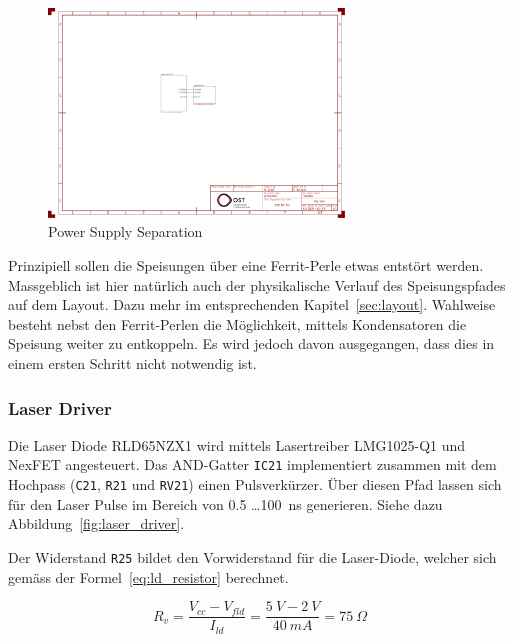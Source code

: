 \begin{figure}[H]
    \centering
    \includegraphics[page=2, trim=260 90 640 550, clip, width=0.7\textwidth]{attachments/schematic.pdf}
    \caption{Power Supply Separation}\label{fig:power_supply_separation}
\end{figure}

Prinzipiell sollen die Speisungen über eine Ferrit-Perle etwas entstört werden. Massgeblich ist hier natürlich auch der
physikalische Verlauf des Speisungspfades auf dem Layout. Dazu mehr im entsprechenden Kapitel~\ref{sec:layout}. Wahlweise
besteht nebst den Ferrit-Perlen die Möglichkeit, mittels Kondensatoren die Speisung weiter zu entkoppeln. Es wird jedoch
davon ausgegangen, dass dies in einem ersten Schritt nicht notwendig ist.

\subsubsection{Laser Driver}\label{sec:schematic_laser_driver}

Die Laser Diode RLD65NZX1 \cite{rohm2019rld65nzx1_datasheet} wird mittels Lasertreiber LMG1025-Q1 \cite{ti2024lmg1025q1_datasheet}
und NexFET \cite{ti2016csd17578q3a_datasheet} angesteuert. Das AND-Gatter \lstinline|IC21| \cite{diodes202074lvc1g08q_datasheet}
implementiert zusammen mit dem Hochpass (\lstinline|C21|, \lstinline|R21| und \lstinline|RV21|) einen Pulsverkürzer.
Über diesen Pfad lassen sich für den Laser Pulse im Bereich von 0.5 \dots 100~ns generieren. Siehe dazu Abbildung~\ref{fig:laser_driver}.

Der Widerstand \lstinline|R25| bildet den Vorwiderstand für die Laser-Diode, welcher sich gemäss der Formel~\ref{eq:ld_resistor} berechnet.

\begin{equation}\label{eq:ld_resistor}
    R_{v} = \frac{V_{cc} - V_{fld}}{I_{ld}} = \frac{5~V - 2~V}{40~mA} = 75~\Omega
\end{equation}

